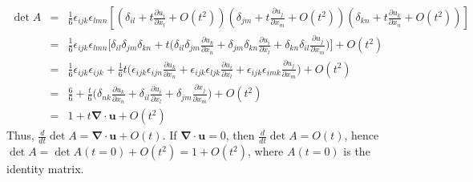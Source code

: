 \documentclass[a4paper]{article}
\begin{document}
\begin{ans}
\begin{enumerate}[label=(\roman*)]
\begin{eqnarray}
\det A&=&\frac{1}{6}\epsilon_{ijk}\epsilon_{lmn}[(\delta_{il}+t\frac{\partial u_i}{\partial x_l}+O(t^2))(\delta_{jm}+t\frac{\partial u_j}{\partial x_m}+O(t^2))(\delta_{kn}+t\frac{\partial u_k}{\partial x_n}+O(t^2))]\nonumber\\&=&\frac{1}{6}\epsilon_{ijk}\epsilon_{lmn}\bigg[\delta_{il}\delta_{jm}\delta_{kn}+t\bigg(\delta_{il}\delta_{jm}\frac{\partial u_k}{\partial x_n}+\delta_{jm}\delta_{kn}\frac{\partial u_i}{\partial x_l}+\delta_{kn}\delta_{il}\frac{\partial u_j}{\partial x_m}\bigg)\bigg]+O(t^2)\nonumber\\&=&\frac{1}{6}\epsilon_{ijk}\epsilon_{ijk}+\frac{1}{6}t\bigg(\epsilon_{ijk}\epsilon_{ijn}\frac{\partial u_k}{\partial x_n}+\epsilon_{ijk}\epsilon_{ljk}\frac{\partial u_i}{\partial x_l}+\epsilon_{ijk}\epsilon_{imk}\frac{\partial u_j}{\partial x_m}\bigg)+O(t^2)\nonumber\\&=&\frac{6}{6}+\frac{t}{6}\bigg(\delta_{nk}\frac{\partial u_k}{\partial x_n}+\delta_{il}\frac{\partial u_i}{\partial x_l}+\delta_{jm}\frac{\partial x_j}{\partial x_m}\bigg)+O(t^2)\nonumber\\&=&1+t\boldsymbol{\nabla}\cdot\mathbf{u}+O(t^2)\nonumber
\end{eqnarray}
Thus, $\frac{d}{dt}\det A=\boldsymbol{\nabla}\cdot\mathbf{u}+O(t)$. If $\boldsymbol{\nabla}\cdot\mathbf{u}=0$, then $\frac{d}{dt}\det A=O(t)$, hence $\det A=\det A(t=0)+O(t^2)=1+O(t^2)$, where $A(t=0)$ is the identity matrix.
\end{enumerate}
\end{ans}
\newpage
\end{document}
